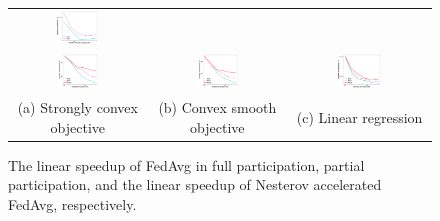 \begin{figure}[t!]
{\begin{tabular}{ccc}
\includegraphics[width=0.33\textwidth]{fig/paper-partiallinregressionspeedupNodesT-min-linearregressionw8a-epsilon002-reg0.pdf}\\
\hspace{-2em}\includegraphics[width=0.33\textwidth]{fig/paper-nesterovspeedupNodesT-min-w8a-epsilon0131-reg1e-05.pdf} & 
\includegraphics[width=0.33\textwidth]{fig/paper-nesterovspeedupNodesT-min-w8a-epsilon0134-reg0.pdf}
& 
\includegraphics[width=0.33\textwidth]{fig/paper-lrnesterovspeedupNodesT-min-linearregressionw8a-epsilon002-reg0.pdf}\\
(a) Strongly convex objective & (b) Convex smooth objective & (c) Linear regression
	\end{tabular}}
	\vspace{-1em}
\caption{The linear speedup of FedAvg in full participation, partial participation, and the linear speedup of Nesterov accelerated FedAvg, respectively.
}
\vspace{-1em}
\label{fig:speedup}
\end{figure}


